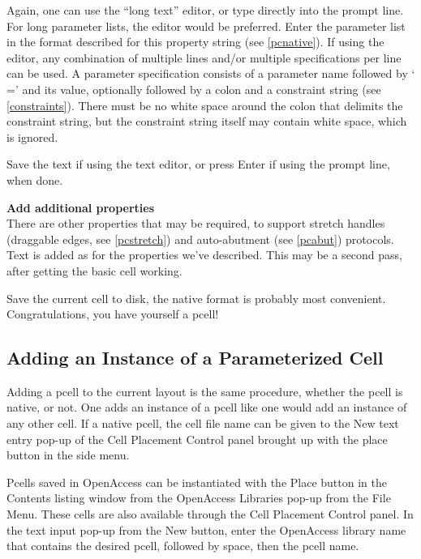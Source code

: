\begin{description}
Again, one can use the ``long text'' editor, or type directly into the
prompt line.  For long parameter lists, the editor would be preferred. 
Enter the parameter list in the format described for this property
string (see \ref{pcnative}).  If using the editor, any combination of
multiple lines and/or multiple specifications per line can be used.  A
parameter specification consists of a parameter name followed by `{\vt
=}' and its value, optionally followed by a colon and a constraint
string (see \ref{constraints}).  There must be no white space around
the colon that delimits the constraint string, but the constraint
string itself may contain white space, which is ignored.

Save the text if using the text editor, or press {\kb Enter} if using
the prompt line, when done.

\item{\bf Add additional properties}\\
There are other properties that may be required, to support stretch
handles (draggable edges, see \ref{pcstretch}) and auto-abutment (see
\ref{pcabut}) protocols.  Text is added as for the properties we've
described.  This may be a second pass, after getting the basic cell
working.
\end{description}

Save the current cell to disk, the native format is probably
most convenient.  Congratulations, you have yourself a pcell!

\subsection{Adding an Instance of a Parameterized Cell}

Adding a pcell to the current layout is the same procedure, whether
the pcell is native, or not.  One adds an instance of a pcell like one
would add an instance of any other cell.  If a native pcell, the cell
file name can be given to the {\cb New} text entry pop-up of the {\cb
Cell Placement Control} panel brought up with the {\cb place} button
in the side menu.

\ifoa
Pcells saved in OpenAccess can be instantiated with the {\cb Place}
button in the {\cb Contents} listing window from the {\cb OpenAccess
Libraries} pop-up from the {\cb File Menu}.  These cells are also
available through the {\cb Cell Placement Control} panel.  In the text
input pop-up from the {\cb New} button, enter the OpenAccess library
name that contains the desired pcell, followed by space, then the
pcell name.
\fi

